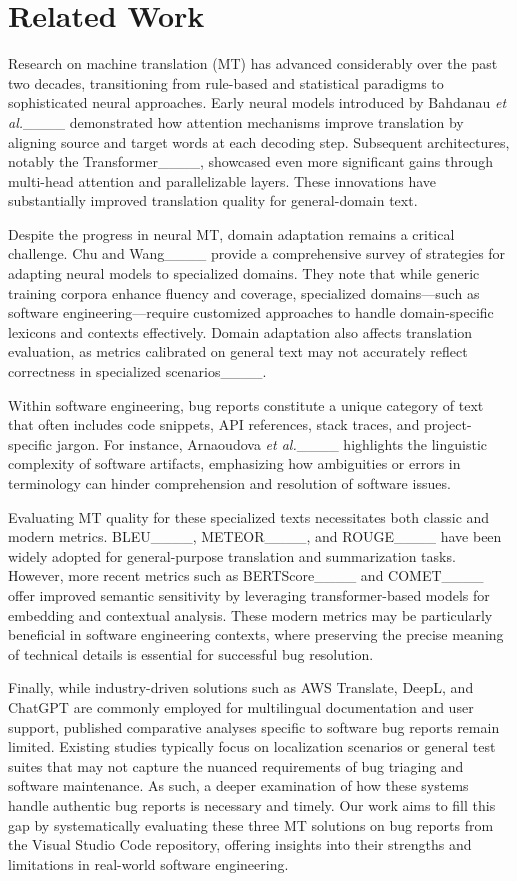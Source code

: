 \section{Related Work}
\label{sec:related_work}
Research on machine translation (MT) has advanced considerably over the past two decades, transitioning from rule-based and statistical paradigms to sophisticated neural approaches. Early neural models introduced by Bahdanau \emph{et al.}____ demonstrated how attention mechanisms improve translation by aligning source and target words at each decoding step. Subsequent architectures, notably the Transformer____, showcased even more significant gains through multi-head attention and parallelizable layers. These innovations have substantially improved translation quality for general-domain text.

Despite the progress in neural MT, domain adaptation remains a critical challenge. Chu and Wang____ provide a comprehensive survey of strategies for adapting neural models to specialized domains. They note that while generic training corpora enhance fluency and coverage, specialized domains—such as software engineering—require customized approaches to handle domain-specific lexicons and contexts effectively. Domain adaptation also affects translation evaluation, as metrics calibrated on general text may not accurately reflect correctness in specialized scenarios____.

Within software engineering, bug reports constitute a unique category of text that often includes code snippets, API references, stack traces, and project-specific jargon. For instance, Arnaoudova \emph{et al.}____ highlights the linguistic complexity of software artifacts, emphasizing how ambiguities or errors in terminology can hinder comprehension and resolution of software issues.

Evaluating MT quality for these specialized texts necessitates both classic and modern metrics. BLEU____, METEOR____, and ROUGE____ have been widely adopted for general-purpose translation and summarization tasks. However, more recent metrics such as BERTScore____ and COMET____ offer improved semantic sensitivity by leveraging transformer-based models for embedding and contextual analysis. These modern metrics may be particularly beneficial in software engineering contexts, where preserving the precise meaning of technical details is essential for successful bug resolution.

Finally, while industry-driven solutions such as AWS Translate, DeepL, and ChatGPT are commonly employed for multilingual documentation and user support, published comparative analyses specific to software bug reports remain limited. Existing studies typically focus on localization scenarios or general test suites that may not capture the nuanced requirements of bug triaging and software maintenance. As such, a deeper examination of how these systems handle authentic bug reports is necessary and timely. Our work aims to fill this gap by systematically evaluating these three MT solutions on bug reports from the Visual Studio Code repository, offering insights into their strengths and limitations in real-world software engineering.